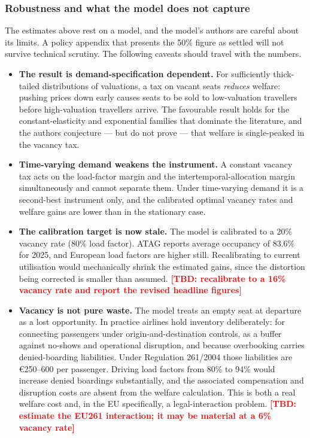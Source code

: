 \documentclass[11pt]{article}
\newcommand{\tbd}[1]{\textcolor{red}{\textbf{[TBD: #1]}}}
\begin{document}
\subsubsection{Robustness and what the model does not capture}
\label{subsec:robustness}

The estimates above rest on a model, and the model's authors are careful about
its limits. A policy appendix that presents the 50\% figure as settled will not
survive technical scrutiny. The following caveats should travel with the
numbers.

\begin{itemize}
  \item \textbf{The result is demand-specification dependent.} For sufficiently
  thick-tailed distributions of valuations, a tax on vacant seats \emph{reduces}
  welfare: pushing prices down early causes seats to be sold to low-valuation
  travellers before high-valuation travellers arrive. The favourable result
  holds for the constant-elasticity and exponential families that dominate the
  literature, and the authors conjecture --- but do not prove --- that welfare
  is single-peaked in the vacancy tax.

  \item \textbf{Time-varying demand weakens the instrument.} A constant vacancy
  tax acts on the load-factor margin and the intertemporal-allocation margin
  simultaneously and cannot separate them. Under time-varying demand it is a
  second-best instrument only, and the calibrated optimal vacancy rates and
  welfare gains are lower than in the stationary case.

  \item \textbf{The calibration target is now stale.} The model is calibrated to
  a 20\% vacancy rate (80\% load factor). ATAG reports average occupancy of
  83.6\% for 2025, and European load factors are higher still. Recalibrating to
  current utilisation would mechanically shrink the estimated gains, since the
  distortion being corrected is smaller than assumed.
  \tbd{recalibrate to a 16\% vacancy rate and report the revised headline
  figures}

  \item \textbf{Vacancy is not pure waste.} The model treats an empty seat at
  departure as a lost opportunity. In practice airlines hold inventory
  deliberately: for connecting passengers under origin-and-destination controls,
  as a buffer against no-shows and operational disruption, and because
  overbooking carries denied-boarding liabilities. Under Regulation
  261/2004 those liabilities are €250--600 per passenger. Driving load factors
  from 80\% to 94\% would increase denied boardings substantially, and the
  associated compensation and disruption costs are absent from the welfare
  calculation. This is both a real welfare cost and, in the EU specifically, a
  legal-interaction problem.
  \tbd{estimate the EU261 interaction; it may be material at a 6\% vacancy rate}


\end{itemize}
\end{document}
